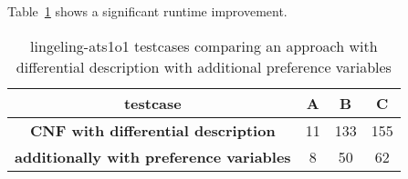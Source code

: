 Table~\ref{tab:pref-vars-results} shows a significant runtime improvement.

\begin{table}[!h]
  \begin{center}
    \begin{tabular}{c|ccc}
      \textbf{testcase}                                & \textbf{A} &  \textbf{B} &  \textbf{C} \\
    \hline
      \textbf{CNF with differential description}       &         11 &         133 &       155 \\
      \textbf{additionally with preference variables}  &          8 &          50 &        62 \\
    \end{tabular}
    \caption{
      lingeling-ats1o1 testcases comparing an approach
      with differential description with additional preference variables
    }
    \label{tab:pref-vars-results}
  \end{center}
\end{table}



